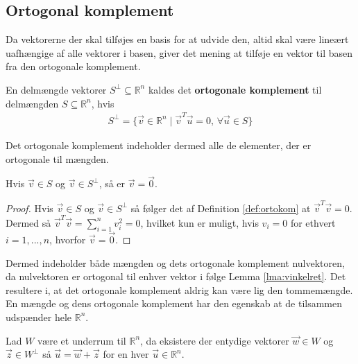 \subsection{Ortogonal komplement}
Da vektorerne der skal tilføjes en basis for at udvide den, altid skal være lineært uafhængige af alle vektorer i basen, giver det mening at tilføje en vektor til basen fra den ortogonale komplement.
\begin{defn}
En delmængde vektorer $S^{\bot} \subseteq \mathds{R}^n$ kaldes det \textbf{ortogonale komplement} til delmængden $S \subseteq \mathds{R}^n$, hvis 
\begin{align*}
	S^{\bot} = \{\vec{v} \in \mathds{R}^n \mid \vec{v}^T\vec{u} = 0, \, \forall \vec{u} \in S\}
\end{align*}
\label{def:ortokom}
\end{defn}
Det ortogonale komplement indeholder dermed alle de elementer, der er ortogonale til mængden.
\begin{prop}
Hvis $\vec{v} \in S$ og $\vec{v} \in S^{\bot}$, så er  $\vec{v}=\vec{0}$.
\label{prop:nulortokomp}
\end{prop}
\begin{proof}
Hvis $\vec{v} \in S$ og $\vec{v} \in S^{\bot}$ så følger det af Definition \ref{def:ortokom} at $\vec{v}^T\vec{v} = 0$.
Dermed så $\vec{v}^T\vec{v} = \sum_{i=1}^n v_i^2 =0$, hvilket kun er muligt, hvis $v_i = 0$ for ethvert $i = 1,..., n$, hvorfor $\vec{v}=\vec{0}$.
\end{proof}
Dermed indeholder både mængden og dets ortogonale komplement nulvektoren, da nulvektoren er ortogonal til enhver vektor i følge Lemma \ref{lma:vinkelret}. 
Det resultere i, at det ortogonale komplement aldrig kan være lig den tommemængde.
En mængde og dens ortogonale komplement har den egenskab at de tilsammen udspænder hele $\mathds{R}^n$.
\begin{stn}
Lad $W$ være et underrum til $\mathds{R}^n$, da eksistere der entydige vektorer  $\vec{w} \in W$ og $\vec{z} \in W^{\bot}$ så $\vec{u}= \vec{w}+\vec{z}$ for en hver $\vec{u} \in \mathds{R}^n$.
\label{stn:Rnorto}
\end{stn}

